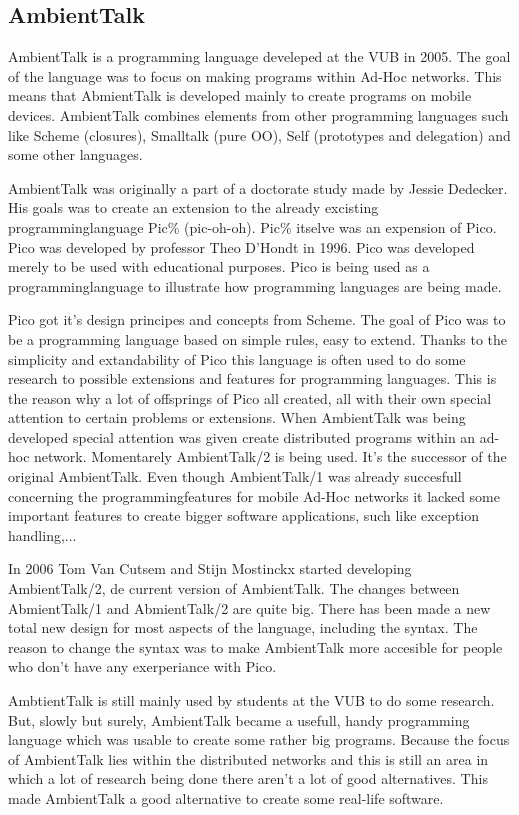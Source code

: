 \documentclass[a4paper,12pt]{report}
\begin{document}
\subsection{AmbientTalk}
AmbientTalk is a programming language develeped at the VUB in 2005. The goal of the language was to focus on making programs within Ad-Hoc networks. This means that AbmientTalk is developed mainly
to create programs on mobile devices. AmbientTalk combines elements from other programming languages such like Scheme (closures), Smalltalk (pure OO), Self (prototypes and delegation) and some
other languages.

AmbientTalk was originally a part of a doctorate study made by Jessie Dedecker. His goals was to create an extension to the already excisting programminglanguage Pic\% (pic-oh-oh). Pic\% itselve
was an expension of Pico. Pico was developed by professor Theo D'Hondt in 1996. Pico was developed merely to be used with educational purposes. Pico is being used as a programminglanguage to
illustrate how programming languages are being made.

Pico got it's design principes and concepts from Scheme. The goal of Pico was to be a programming language based on simple rules, easy to extend. Thanks to the simplicity and extandability of Pico
this language is often used to do some research to possible extensions and features for programming languages. This is the reason why a lot of offsprings of Pico all created, all with their own
special attention to certain problems or extensions. When AmbientTalk was being developed special attention was given create distributed programs within an ad-hoc network.
Momentarely AmbientTalk/2 is being used. It's the successor of the original AmbientTalk. Even though AmbientTalk/1 was already succesfull concerning the programmingfeatures for mobile Ad-Hoc
networks it lacked some important features to create bigger software applications, such like exception handling,...

In 2006 Tom Van Cutsem and Stijn Mostinckx started developing AmbientTalk/2, de current version of AmbientTalk. The changes between AbmientTalk/1 and AbmientTalk/2 are quite big. There has been
made a new total new design for most aspects of the language, including the syntax. The reason to change the syntax was to make AmbientTalk more accesible for people who don't have any exerperiance
with Pico. 

AmbtientTalk is still mainly used by students at the VUB to do some research. But, slowly but surely, AmbientTalk became a usefull, handy programming language which was usable to create some
rather big programs. Because the focus of AmbientTalk lies within the distributed networks and this is still an area in which a lot of research being done there aren't a lot of good alternatives.
This made AmbientTalk a good alternative to create some real-life software.
\end{document}
